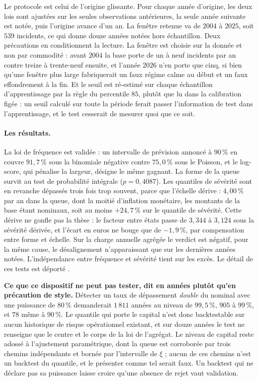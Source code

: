 Le protocole est celui de l'origine glissante. Pour chaque année d'origine, les deux lois sont
ajustées sur les seules observations antérieures, la seule année suivante est notée, puis
l'origine avance d'un an. La fenêtre retenue va de $2004$ à $2025$, soit $539$ incidents, ce qui
donne douze années notées hors échantillon. Deux précautions en conditionnent la lecture. La
fenêtre est choisie sur la donnée et non par commodité : avant $2004$ la base porte de un à neuf
incidents par an contre treize à trente-neuf ensuite, et l'année $2026$ n'en porte que cinq, si
bien qu'une fenêtre plus large fabriquerait un faux régime calme au début et un faux
effondrement à la fin. Et le seuil est ré-estimé sur chaque échantillon d'apprentissage
par la règle du percentile $85$, plutôt que lu dans la calibration figée : un seuil calculé sur
toute la période ferait passer l'information de test dans l'apprentissage, et le test cesserait
de mesurer quoi que ce soit.

\paragraph{Les résultats.} La loi de fréquence est validée : un intervalle de prévision annoncé à
$90\,\%$ en couvre $91{,}7\,\%$ sous la binomiale négative contre $75{,}0\,\%$ sous le Poisson,
et le log-score, qui pénalise la largeur, désigne le même gagnant. La forme de la queue survit au
test de probabilité intégrale ($p=0{,}4087$). Les quantiles de sévérité sont en revanche dépassés
trois fois trop souvent, parce que l'échelle dérive : $4{,}00\,\%$ par an dans la queue, dont la
moitié d'inflation monétaire, les montants de la base étant nominaux, soit au moins
$+24{,}7\,\%$ sur le quantile de sévérité. Cette dérive ne gonfle pas la thèse : le facteur entre
états passe de $3{,}344$ à $3{,}124$ sous la sévérité dérivée, et l'écart en euros ne bouge que
de $-1{,}9\,\%$, par compensation entre forme et échelle. Sur la charge annuelle agrégée le
verdict est négatif, pour la même cause, le désalignement n'apparaissant que sur les dernières
années notées. L'indépendance entre fréquence et sévérité tient sur les excès. Le détail de ces
tests est déporté \matcomp.

\begin{attention}
\textbf{Ce que ce dispositif ne peut pas tester, dit en années plutôt qu'en précaution de style.}
Détecter un taux de dépassement \emph{double} du nominal avec une puissance de $80\,\%$
demanderait $1\,811$ années au niveau de $99{,}5\,\%$, $905$ à $99\,\%$, et $78$ même à
$90\,\%$. Le quantile qui porte le capital n'est donc backtestable sur aucun historique
de risque opérationnel existant, et sur douze années le test ne renseigne que le centre et le
corps de la loi de l'agrégat. Le niveau de capital reste adossé à l'ajustement paramétrique,
dont la queue est corroborée par trois chemins indépendants et bornée par l'intervalle de
$\xi$ ; aucun de ces chemins n'est un backtest du quantile, et le présenter comme tel serait
faux. Un backtest qui ne déclare pas sa puissance laisse croire qu'une absence de rejet vaut
validation.
\end{attention}


